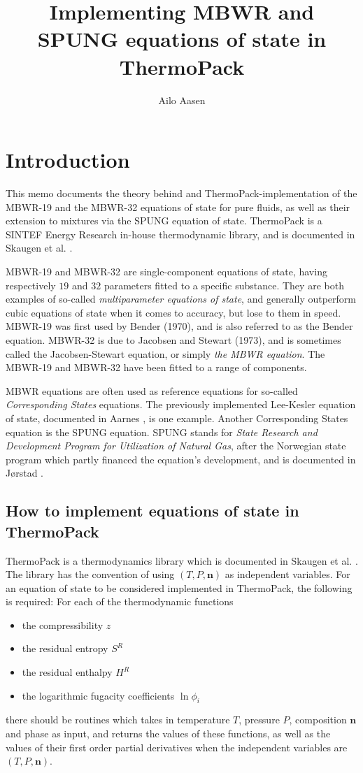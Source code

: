 \documentclass[english]{../thermomemo/thermomemo}
\title{Implementing MBWR and SPUNG equations of state in ThermoPack}
\author{Ailo Aasen}
\newcommand{\mbn}[0]{\mathbf n}
\numberwithin{equation}{section}
\begin{document}
\frontmatter
\tableofcontents

\section{Introduction}
This memo documents the theory behind and ThermoPack-implementation of
the MBWR-19 and the MBWR-32 equations of state for pure fluids, as
well as their extension to mixtures via the SPUNG equation of
state. ThermoPack is a SINTEF Energy Research in-house thermodynamic library, and is
documented in Skaugen et al. \cite{ThermoPackDoc13}.

MBWR-19 and MBWR-32 are single-component equations of
state, having respectively $19$ and $32$ parameters fitted
to a specific substance. They are both examples of so-called
\textit{multiparameter equations of state}, and generally outperform
cubic equations of state when it comes to accuracy, but lose to them
in speed. MBWR-19 was first used by Bender (1970), and is also
referred to as the Bender equation. MBWR-32 is due to Jacobsen and
Stewart (1973), and is sometimes called the Jacobsen-Stewart equation,
or simply \textit{the MBWR equation}. The MBWR-19 and MBWR-32 have
been fitted to a range of components.

MBWR equations are often used as reference equations for so-called
\textit{Corresponding States} equations. The previously implemented
Lee-Kesler equation of state, documented in Aarnes \cite{Aarnes13}, is
one example. Another Corresponding States equation is the SPUNG
equation. SPUNG stands for \textit{State Research and Development
  Program for Utilization of Natural Gas}, after the Norwegian state
program which partly financed the equation's development, and is
documented in J{\o}rstad \cite{Jorstad93}.

\subsection{How to implement equations of state in ThermoPack}
ThermoPack is a thermodynamics library which is documented in Skaugen et al.
\cite{ThermoPackDoc13}. The library has the convention of using $(T, P, \mbn)$ as
independent variables. For an equation of state to be considered implemented
in ThermoPack, the following is required: For each of the thermodynamic functions
\begin{itemize}
\item the compressibility $z$
\item the residual entropy $S^R$
\item the residual enthalpy $H^R$
\item the logarithmic fugacity coefficients $\ln \phi_i$
\end{itemize}
there should be routines which takes in temperature $T$, pressure $P$,
composition $\mbn$ and phase as input, and returns the values of these functions, as
well as the values of their first order partial derivatives when the independent
variables are $(T, P, \mbn)$.
\end{document}

